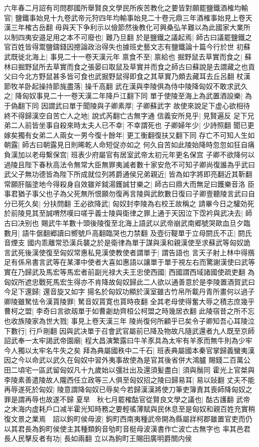 六年春二月詔有司問郡國所舉賢良文學民所疾苦教化之要皆對願罷鹽鐵酒榷均輸官|{
	鹽鐵事始見十九卷武帝元狩四年均輸事始見二十卷元鼎三年酒榷事始見上卷天漢三年榷古岳翻}
毋與天下争利示以儉節然後教化可興桑弘羊難以為此國家大業所以制四夷安邉足用之本不可廢也|{
	難乃旦翻}
於是鹽鐵之議起焉|{
	師古曰議罷鹽鐵之官百姓皆得鬻鹽鑄錢因摠論政治得失也據班史藝文志有鹽鐵論十篇今行於世}
初蘇武既徙北海上|{
	事見二十一卷天漢元年}
禀食不至|{
	禀給也}
掘野鼠去草實而食之|{
	蘇林曰掘野鼠所去草實而食之張晏曰取鼠及草實并而食之師古曰蘇說是去謂藏之也貢父曰今北方野鼠甚多皆可食也武掘野鼠得即食之其草實乃頗去藏耳去丘呂翻}
杖漢節牧羊卧起操持節旄盡落|{
	操千高翻}
武在漢與李陵俱為侍中陵降匈奴不敢求武久之|{
	降匈奴事見二十一卷天漢二年降戶江翻下同}
單于使陵至海上為武置酒設樂|{
	為于偽翻下同}
因謂武曰單于聞陵與子卿素厚|{
	子卿蘇武字}
故使來說足下虚心欲相待終不得歸漢空自苦亡人之地|{
	說式芮翻亡古無字通}
信義安所見乎|{
	見賢遍反}
足下兄弟二人前皆坐事自殺來時太夫人已不幸|{
	不幸謂死也}
子卿婦年少|{
	少詩照翻}
聞已更嫁矣獨有女弟二人兩女一男今復十餘年|{
	更工衡翻復扶又翻下同}
存亡不可知人生如朝露|{
	師古曰朝露見日則晞乾人命短促亦如之}
何久自苦如此陵始降時忽忽如狂自痛負漢加以老母繫保宫|{
	班表少府屬官有居室武帝太初元年更名保宫}
子卿不欲降何以過陵且陛下春秋高法令無常大臣無罪夷滅者數十家安危不可知子卿尚復誰為乎武曰武父子無功德皆為陛下所成就位列將爵通侯兄弟親近|{
	皆為如字將即亮翻近其靳翻}
常願肝腦塗地今得殺身自效雖斧鉞湯鑊誠甘樂之|{
	師古曰鼎大而無足曰鑊樂音洛}
臣事君猶子事父也子為父死無所恨願勿復再言陵與武飲數日復曰子卿壹聽陵言武曰自分已死久矣|{
	分扶問翻}
王必欲降武|{
	匈奴封李陵為右校王故稱之}
請畢今日之驩効死於前陵見其至誠喟然嘆曰嗟乎義士陵與衛律之罪上通于天因泣下霑衿與武决去|{
	師古曰决别也}
賜武牛羊數十頭後陵復至北海上語武以武帝崩武南郷號哭歐血旦夕臨數月|{
	語牛倨翻郷讀曰嚮號戶高翻臨哭也力禁翻}
及壺衍鞮單于立母閼氏不正|{
	閼氏音煙支}
國内乖離常恐漢兵襲之於是衛律為單于謀與漢和親漢使至求蘇武等匈奴詭言武死後漢使復至匈奴常惠私見漢使教使者謂單于|{
	謂告語也}
言天子射上林中得鴈足有係帛書言武等在某澤中使者大喜如惠語以讓單于單于視左右而驚謝漢使曰武等實在乃歸武及馬宏等馬宏者前副光禄大夫王忠使西國|{
	西國謂西域諸國使疏吏翻}
為匈奴所遮忠戰死馬宏生得亦不肯降故匈奴歸此二人欲以通善意於是李陵置酒賀武曰今足下還歸|{
	還音旋又如字}
揚名於匈奴功顯於漢室雖古竹帛所載丹青所畫何以過子卿陵雖駑怯令漢貰陵罪|{
	駑音奴貰寛也貰時夜翻}
全其老母使得奮大辱之積志庶幾乎曹柯之盟|{
	李奇曰言欲刼單于如曹劌劫齊桓公柯盟之時幾居衣翻}
此陵宿昔之所不忘也收族陵家為世大戮|{
	事見上卷天漢三年}
陵尚復何所顧乎已矣令子卿知吾心耳陵泣下數行|{
	行戶剛翻}
因與武决單于召會武官屬前已降及物故凡隨武還者九人既至京師詔武奉一太牢謁武帝園廟|{
	程大昌演繁露曰牛羊豕具為太牢有羊豕而無牛則為少牢今人獨以太牢名牛失之矣}
拜為典屬國秩中二千石|{
	班表典屬國本秦官掌歸義蠻夷漢因之今以命武以武久在匈奴中習外夷事故使為是官其後省併大鴻臚}
賜錢二百萬公田二頃宅一區武留匈奴凡十九歲始以彊壯出及還須髪盡白|{
	須與鬚同}
霍光上官桀與李陵素善遣陵故人隴西任立政等三人俱至匈奴招之陵曰歸易耳|{
	易以䜴翻}
丈夫不能再辱遂死於匈奴|{
	陵意謂降匈奴已辱矣今若歸漢漢將使刀筆吏簿責其喪師降匈奴之罪是謂再辱也故遂不歸}
夏旱　秋七月罷榷酤官從賢良文學之議也|{
	酤古護翻}
武帝之末海内虚耗戶口减半霍光知時務之要輕徭薄賦與民休息至是匈奴和親百姓充實稍復文景之業焉　詔以鉤町侯毋波|{
	鉤町西南夷種武帝開為縣屬牂柯郡雖置官吏而仍以其君長為鉤町侯使主其種類鉤音劬町音梃母波漢書作亡波亡古無字也}
率其邑君長人民擊反者有功|{
	長如兩翻}
立以為鉤町王賜田廣明爵關内侯

